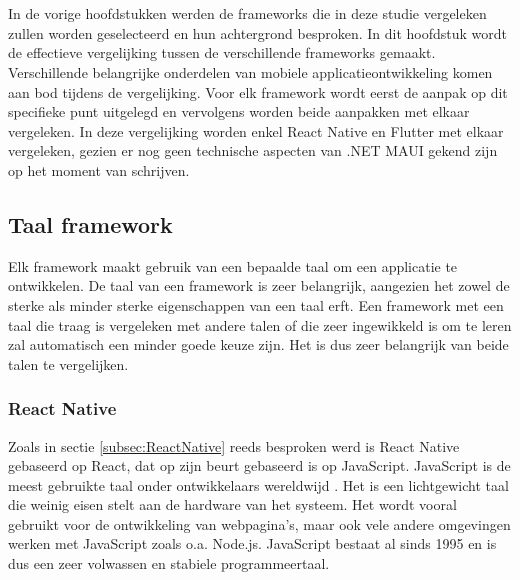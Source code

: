 
\chapter{}
\label{ch:methodologie}


In de vorige hoofdstukken werden de frameworks die in deze studie vergeleken zullen worden geselecteerd en hun achtergrond besproken. In dit hoofdstuk wordt de effectieve vergelijking tussen de verschillende frameworks gemaakt. Verschillende belangrijke onderdelen van mobiele applicatieontwikkeling komen aan bod tijdens de vergelijking. Voor elk framework wordt eerst de aanpak op dit specifieke punt uitgelegd en vervolgens worden beide aanpakken met elkaar vergeleken. In deze vergelijking worden enkel React Native en Flutter met elkaar vergeleken, gezien er nog geen technische aspecten van .NET MAUI gekend zijn op het moment van schrijven.

\section{Taal framework}
\label{subsec:taalFramework}

Elk framework maakt gebruik van een bepaalde taal om een applicatie te ontwikkelen. De taal van een framework is zeer belangrijk, aangezien het zowel de sterke als minder sterke eigenschappen van een taal erft. Een framework met een taal die traag is vergeleken met andere talen of die zeer ingewikkeld is om te leren zal automatisch een minder goede keuze zijn. Het is dus zeer belangrijk van beide talen te vergelijken.

\subsection{React Native}
\label{subsubsec:taalReactNative}

Zoals in sectie \ref{subsec:ReactNative} reeds besproken werd is React Native gebaseerd op React, dat op zijn beurt gebaseerd is op JavaScript. JavaScript is de meest gebruikte taal onder ontwikkelaars wereldwijd \autocite{Liu2020a}. Het is een lichtgewicht taal die weinig eisen stelt aan de hardware van het systeem. Het wordt vooral gebruikt voor de ontwikkeling van webpagina's, maar ook vele andere omgevingen werken met JavaScript zoals o.a. Node.js. JavaScript bestaat al sinds 1995 en is dus een zeer volwassen en stabiele programmeertaal.

